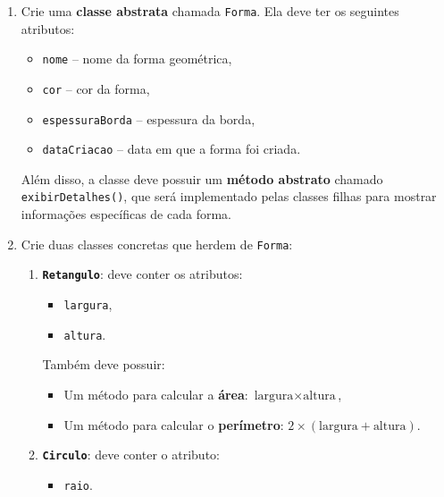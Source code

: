\documentclass{article}
\begin{document}
\begin{enumerate}
    \item Crie uma \textbf{classe abstrata} chamada \texttt{Forma}.
          Ela deve ter os seguintes atributos:
          \begin{itemize}
              \item \texttt{nome} -- nome da forma geométrica,
              \item \texttt{cor} -- cor da forma,
              \item \texttt{espessuraBorda} -- espessura da borda,
              \item \texttt{dataCriacao} -- data em que a forma foi criada.
          \end{itemize}

          Além disso, a classe deve possuir um \textbf{método abstrato} chamado \texttt{exibirDetalhes()},
          que será implementado pelas classes filhas para mostrar informações específicas de cada forma.

    \item Crie duas classes concretas que herdem de \texttt{Forma}:
          \begin{enumerate}
              \item \textbf{\texttt{Retangulo}}: deve conter os atributos:
                    \begin{itemize}
                        \item \texttt{largura},
                        \item \texttt{altura}.
                    \end{itemize}

                    Também deve possuir:
                    \begin{itemize}
                        \item Um método para calcular a \textbf{área}: \(\text{largura} \times \text{altura}\),
                        \item Um método para calcular o \textbf{perímetro}: \(2 \times (\text{largura} + \text{altura})\).
                    \end{itemize}

              \item \textbf{\texttt{Circulo}}: deve conter o atributo:
                    \begin{itemize}
                        \item \texttt{raio}.
                    \end{itemize}


\end{enumerate}
\end{enumerate}
\end{document}
